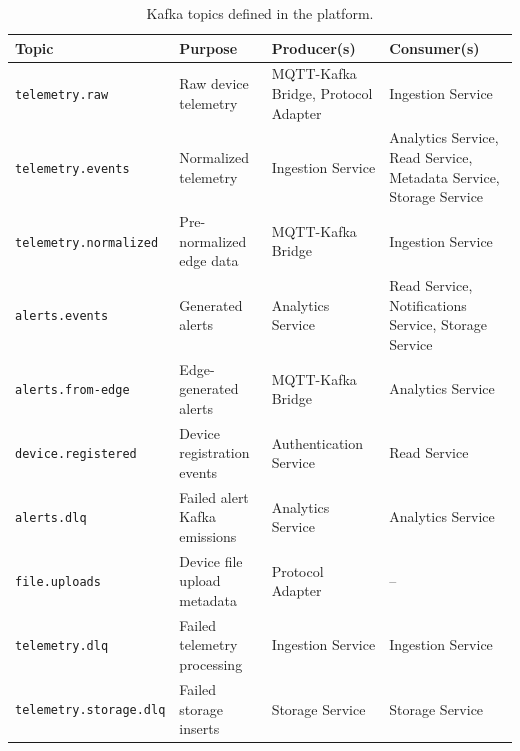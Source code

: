 \begin{table}[htbp]
    \centering
    \caption{Kafka topics defined in the platform.}
    \label{tab:kafka-topics}
    \small
    \begin{tabularx}{\textwidth}{l l X X}
        \toprule
        \textbf{Topic}                 & \textbf{Purpose}             & \textbf{Producer(s)}                & \textbf{Consumer(s)}                                               \\
        \midrule
        \texttt{telemetry.raw}         & Raw device telemetry         & MQTT-Kafka Bridge, Protocol Adapter & Ingestion Service                                                  \\
        \texttt{telemetry.events}      & Normalized telemetry         & Ingestion Service                   & Analytics Service, Read Service, Metadata Service, Storage Service \\
        \texttt{telemetry.normalized}  & Pre-normalized edge data     & MQTT-Kafka Bridge                   & Ingestion Service                                                  \\
        \texttt{alerts.events}         & Generated alerts             & Analytics Service                   & Read Service, Notifications Service, Storage Service               \\
        \texttt{alerts.from-edge}      & Edge-generated alerts        & MQTT-Kafka Bridge                   & Analytics Service                                                  \\
        \texttt{device.registered}     & Device registration events   & Authentication Service              & Read Service                                                       \\
        \texttt{alerts.dlq}            & Failed alert Kafka emissions & Analytics Service                   & Analytics Service                                                  \\
        \texttt{file.uploads}          & Device file upload metadata  & Protocol Adapter                    & --                                                                 \\
        \texttt{telemetry.dlq}         & Failed telemetry processing  & Ingestion Service                   & Ingestion Service                                                  \\
        \texttt{telemetry.storage.dlq} & Failed storage inserts       & Storage Service                     & Storage Service                                                    \\
        \bottomrule
    \end{tabularx}
\end{table}

